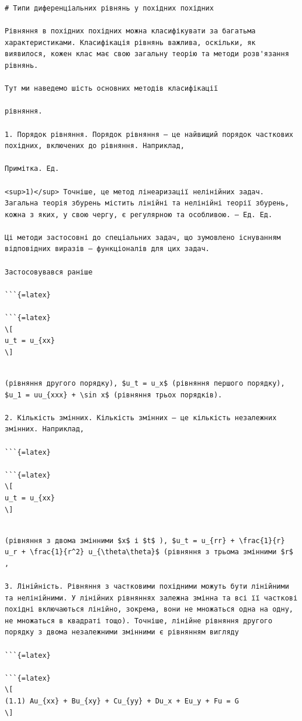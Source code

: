 \documentclass[
  ukrainian,
]{article}
\begin{document}
\begin{verbatim}
# Типи диференціальних рівнянь у похідних похідних

Рівняння в похідних похідних можна класифікувати за багатьма характеристиками. Класифікація рівнянь важлива, оскільки, як виявилося, кожен клас має свою загальну теорію та методи розв'язання рівнянь.

Тут ми наведемо шість основних методів класифікації

рівняння.

1. Порядок рівняння. Порядок рівняння — це найвищий порядок часткових похідних, включених до рівняння. Наприклад,

Примітка. Ед.

<sup>1)</sup> Точніше, це метод лінеаризації нелінійних задач. Загальна теорія збурень містить лінійні та нелінійні теорії збурень, кожна з яких, у свою чергу, є регулярною та особливою. — Ед. Ед.

Ці методи застосовні до спеціальних задач, що зумовлено існуванням відповідних виразів — функціоналів для цих задач.

Застосовувався раніше

```{=latex}

```{=latex}
\[
u_t = u_{xx}
\]
\end{verbatim}

\begin{verbatim}

(рівняння другого порядку), $u_t = u_x$ (рівняння першого порядку), $u_1 = uu_{xxx} + \sin x$ (рівняння трьох порядків).

2. Кількість змінних. Кількість змінних — це кількість незалежних змінних. Наприклад,

```{=latex}

```{=latex}
\[
u_t = u_{xx}
\]
\end{verbatim}

\begin{verbatim}

(рівняння з двома змінними $x$ і $t$ ), $u_t = u_{rr} + \frac{1}{r} u_r + \frac{1}{r^2} u_{\theta\theta}$ (рівняння з трьома змінними $r$ ,

3. Лінійність. Рівняння з частковими похідними можуть бути лінійними та нелінійними. У лінійних рівняннях залежна змінна та всі її часткові похідні включаються лінійно, зокрема, вони не множаться одна на одну, не множаться в квадраті тощо). Точніше, лінійне рівняння другого порядку з двома незалежними змінними є рівнянням вигляду

```{=latex}

```{=latex}
\[
(1.1) Au_{xx} + Bu_{xy} + Cu_{yy} + Du_x + Eu_y + Fu = G
\]
\end{verbatim}
\end{document}
